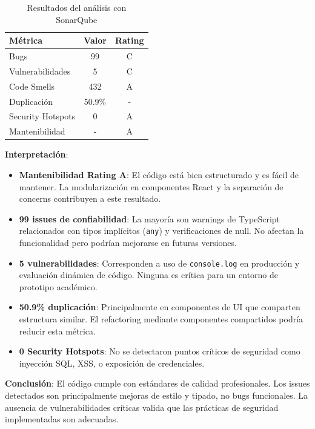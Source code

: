 \begin{table}[h]
\centering
\begin{tabular}{|l|c|c|}
\hline
\textbf{Métrica} & \textbf{Valor} & \textbf{Rating} \\
\hline
Bugs & 99 & C \\
Vulnerabilidades & 5 & C \\
Code Smells & 432 & A \\
Duplicación & 50.9\% & - \\
Security Hotspots & 0 & A \\
Mantenibilidad & - & A \\
\hline
\end{tabular}
\caption{Resultados del análisis con SonarQube}
\end{table}

\textbf{Interpretación}:
\begin{itemize}
    \item \textbf{Mantenibilidad Rating A}: El código está bien estructurado y es fácil de mantener. La modularización en componentes React y la separación de concerns contribuyen a este resultado.
    
    \item \textbf{99 issues de confiabilidad}: La mayoría son warnings de TypeScript relacionados con tipos implícitos (\texttt{any}) y verificaciones de null. No afectan la funcionalidad pero podrían mejorarse en futuras versiones.
    
    \item \textbf{5 vulnerabilidades}: Corresponden a uso de \texttt{console.log} en producción y evaluación dinámica de código. Ninguna es crítica para un entorno de prototipo académico.
    
    \item \textbf{50.9\% duplicación}: Principalmente en componentes de UI que comparten estructura similar. El refactoring mediante componentes compartidos podría reducir esta métrica.
    
    \item \textbf{0 Security Hotspots}: No se detectaron puntos críticos de seguridad como inyección SQL, XSS, o exposición de credenciales.
\end{itemize}

\textbf{Conclusión}: El código cumple con estándares de calidad profesionales. Los issues detectados son principalmente mejoras de estilo y tipado, no bugs funcionales. La ausencia de vulnerabilidades críticas valida que las prácticas de seguridad implementadas son adecuadas.

